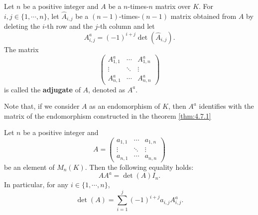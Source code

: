 \begin{definitionenv}
    Let $n$ be a positive integer and $A$ be a $n$-times-$n$ matrix over $K$.
    For $i,j \in \{1,\cdots,n\}$, let $\hat{A}_{i,j}$ be a $(n-1)$-times-$(n-1)$ matrix obtained from $A$ by deleting the $i$-th row and the $j$-th column and let
    $$ A^a_{i,j} = (-1)^{i+j}\det (\hat{A}_{i,j}).$$
    The matrix
    $$\begin{pmatrix}
        A^a_{1,1} & \cdots & A^a_{1,n}\\
        \vdots & \ddots & \vdots\\
        A^a_{n,1} & \cdots & A^a_{n,n}
    \end{pmatrix}$$
    is called the \textbf{adjugate} of $A$, denoted as $A^a$.

    \quad Note that, if we consider $A$ as an endomorphism of $K$, then $A^a$ identifies with the matrix of the endomorphism constructed in the theorem \ref{thm:4.7.1}
\end{definitionenv}

\begin{corollaryenv}
    Let $n$ be a positive integer and
    $$A = \begin{pmatrix}
        a_{1,1} & \cdots & a_{1,n}\\
        \vdots & \ddots & \vdots\\
        a_{n,1} & \cdots & a_{n,n}
    \end{pmatrix}$$
    be an element of $M_n(K)$.
    Then the following equality holds:
    $$ AA^a = \det (A) I_n.$$
    In particular, for any $i\in \{1,\cdots,n\}$,
    $$ \det (A) = \sum_{i=1}^{j} (-1)^{i+j} a_{i,j} A^a_{i,j}.$$
\end{corollaryenv}
